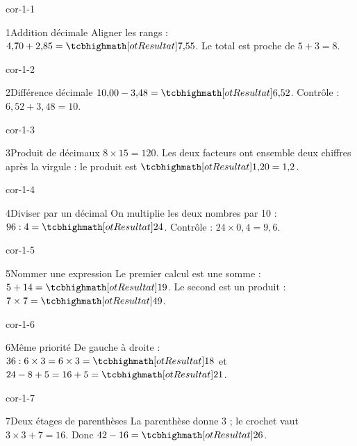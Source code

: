 \clearpage\pagestyle{otMain}\setlength{\otBlocEspacement}{2.5mm}\fontsize{11}{15}\selectfont{}
\begin{blocLivre}{cor-1-1}\begin{corrige}{1}{Addition décimale}
Aligner les rangs : $4{,}70+2{,}85=\res{7{,}55}$. Le total est proche de $5+3=8$.
\end{corrige}\end{blocLivre}
\begin{blocLivre}{cor-1-2}\begin{corrige}{2}{Différence décimale}
$10{,}00-3{,}48=\res{6{,}52}$. Contrôle : $6{,}52+3{,}48=10$.
\end{corrige}\end{blocLivre}
\begin{blocLivre}{cor-1-3}\begin{corrige}{3}{Produit de décimaux}
$8\times15=120$. Les deux facteurs ont ensemble deux chiffres après la virgule : le produit est $\res{1{,}20=1{,}2}$.
\end{corrige}\end{blocLivre}
\begin{blocLivre}{cor-1-4}\begin{corrige}{4}{Diviser par un décimal}
On multiplie les deux nombres par 10 : $96:4=\res{24}$. Contrôle : $24\times0{,}4=9{,}6$.
\end{corrige}\end{blocLivre}
\begin{blocLivre}{cor-1-5}\begin{corrige}{5}{Nommer une expression}
Le premier calcul est une somme : $5+14=\res{19}$. Le second est un produit : $7\times7=\res{49}$.
\end{corrige}\end{blocLivre}
\begin{blocLivre}{cor-1-6}\begin{corrige}{6}{Même priorité}
De gauche à droite : $36:6\times3=6\times3=\res{18}$ et $24-8+5=16+5=\res{21}$.
\end{corrige}\end{blocLivre}
\begin{blocLivre}{cor-1-7}\begin{corrige}{7}{Deux étages de parenthèses}
La parenthèse donne 3 ; le crochet vaut $3\times3+7=16$. Donc $42-16=\res{26}$.
\end{corrige}\end{blocLivre}
